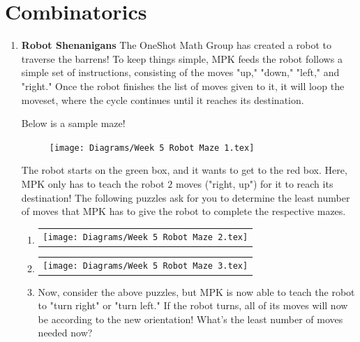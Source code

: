 \documentclass[11pt]{scrartcl}
\begin{document}
\newpage
\section{Combinatorics}
\begin{enumerate}[label=\textbf{C\arabic*}.]
    \item \textbf{Robot Shenanigans} \newline
    The OneShot Math Group has created a robot to traverse the barrens! To keep things simple, MPK feeds the robot follows a simple set of instructions, consisting of the moves "up," "down," "left," and "right." Once the robot finishes the list of moves given to it, it will loop the moveset, where the cycle continues until it reaches its destination.
    
    Below is a sample maze!
    \begin{figure}[h]
        \centering
        \texttt{[image: Diagrams/Week 5 Robot Maze 1.tex]}
    \end{figure}
    The robot starts on the green box, and it wants to get to the red box. Here, MPK only has to teach the robot $2$ moves ("right, up") for it to reach its destination! The following puzzles ask for you to determine the least number of moves that MPK has to give the robot to complete the respective mazes.
    
    \begin{enumerate}
        \item \begin{tabular}{C{11cm}}
            \texttt{[image: Diagrams/Week 5 Robot Maze 2.tex]}
        \end{tabular}
        
        \item \begin{tabular}{C{11cm}}
            \texttt{[image: Diagrams/Week 5 Robot Maze 3.tex]}
        \end{tabular}
        
        \item Now, consider the above puzzles, but MPK is now able to teach the robot to "turn right" or "turn left." If the robot turns, all of its moves will now be according to the new orientation! What's the least number of moves needed now?
    \end{enumerate}
\end{enumerate}

\newpage
\end{document}
